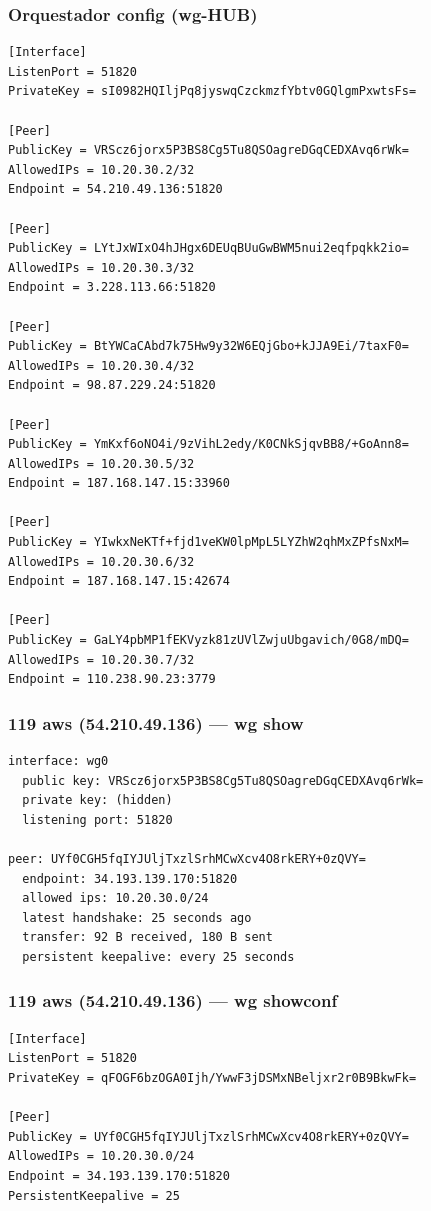 \documentclass[11pt,a4paper]{article}
\begin{document}
\subsubsection*{Orquestador config (wg-HUB)}
\begin{lstlisting}
[Interface]
ListenPort = 51820
PrivateKey = sI0982HQIljPq8jyswqCzckmzfYbtv0GQlgmPxwtsFs=

[Peer]
PublicKey = VRScz6jorx5P3BS8Cg5Tu8QSOagreDGqCEDXAvq6rWk=
AllowedIPs = 10.20.30.2/32
Endpoint = 54.210.49.136:51820

[Peer]
PublicKey = LYtJxWIxO4hJHgx6DEUqBUuGwBWM5nui2eqfpqkk2io=
AllowedIPs = 10.20.30.3/32
Endpoint = 3.228.113.66:51820

[Peer]
PublicKey = BtYWCaCAbd7k75Hw9y32W6EQjGbo+kJJA9Ei/7taxF0=
AllowedIPs = 10.20.30.4/32
Endpoint = 98.87.229.24:51820

[Peer]
PublicKey = YmKxf6oNO4i/9zVihL2edy/K0CNkSjqvBB8/+GoAnn8=
AllowedIPs = 10.20.30.5/32
Endpoint = 187.168.147.15:33960

[Peer]
PublicKey = YIwkxNeKTf+fjd1veKW0lpMpL5LYZhW2qhMxZPfsNxM=
AllowedIPs = 10.20.30.6/32
Endpoint = 187.168.147.15:42674

[Peer]
PublicKey = GaLY4pbMP1fEKVyzk81zUVlZwjuUbgavich/0G8/mDQ=
AllowedIPs = 10.20.30.7/32
Endpoint = 110.238.90.23:3779

\end{lstlisting}

\subsubsection*{119 aws (54.210.49.136) — wg show}
\begin{lstlisting}
interface: wg0
  public key: VRScz6jorx5P3BS8Cg5Tu8QSOagreDGqCEDXAvq6rWk=
  private key: (hidden)
  listening port: 51820

peer: UYf0CGH5fqIYJUljTxzlSrhMCwXcv4O8rkERY+0zQVY=
  endpoint: 34.193.139.170:51820
  allowed ips: 10.20.30.0/24
  latest handshake: 25 seconds ago
  transfer: 92 B received, 180 B sent
  persistent keepalive: every 25 seconds

\end{lstlisting}

\subsubsection*{119 aws (54.210.49.136) — wg showconf}
\begin{lstlisting}
[Interface]
ListenPort = 51820
PrivateKey = qFOGF6bzOGA0Ijh/YwwF3jDSMxNBeljxr2r0B9BkwFk=

[Peer]
PublicKey = UYf0CGH5fqIYJUljTxzlSrhMCwXcv4O8rkERY+0zQVY=
AllowedIPs = 10.20.30.0/24
Endpoint = 34.193.139.170:51820
PersistentKeepalive = 25

\end{lstlisting}
\end{document}
